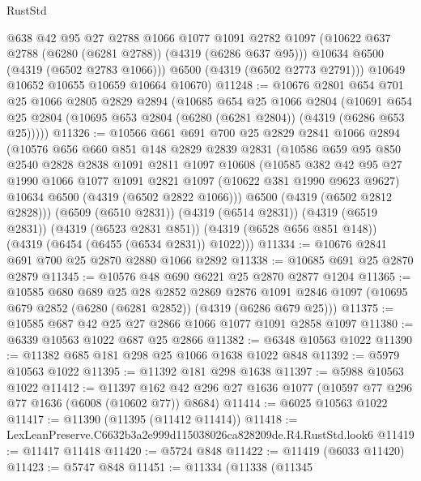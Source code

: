 \begin{lexlean}{RustStd}
\begin{coremodule}
          @638
          @42
          @95
          @27
          @2788
          @1066
          @1077
          @1091
          @2782
          @1097
          (@10622 @637 @2788 (@6280 (@6281 @2788)) (@4319 (@6286 @637 @95)))
          @10634
          @6500
          (@4319 (@6502 @2783 @1066)))
        @6500
        (@4319 (@6502 @2773 @2791)))
      @10649
      @10652
      @10655
      @10659
      @10664
      @10670)
@11248 := @10676
    @2801
    @654
    @701
    @25
    @1066
    @2805
    @2829
    @2894
    (@10685
      @654
      @25
      @1066
      @2804
      (@10691 @654 @25 @2804 (@10695 @653 @2804 (@6280 (@6281 @2804)) (@4319 (@6286 @653 @25)))))
@11326 := @10566
    @661
    @691
    @700
    @25
    @2829
    @2841
    @1066
    @2894
    (@10576
      @656
      @660
      @851
      @148
      @2829
      @2839
      @2831
      (@10586
        @659
        @95
        @850
        @2540
        @2828
        @2838
        @1091
        @2811
        @1097
        @10608
        (@10585
          @382
          @42
          @95
          @27
          @1990
          @1066
          @1077
          @1091
          @2821
          @1097
          (@10622 @381 @1990 @9623 @9627)
          @10634
          @6500
          (@4319 (@6502 @2822 @1066)))
        @6500
        (@4319 (@6502 @2812 @2828)))
      (@6509 (@6510 @2831))
      (@4319 (@6514 @2831))
      (@4319 (@6519 @2831))
      (@4319 (@6523 @2831 @851))
      (@4319 (@6528 @656 @851 @148))
      (@4319 (@6454 (@6455 (@6534 @2831)) @1022)))
@11334 := @10676 @2841 @691 @700 @25 @2870 @2880 @1066 @2892
@11338 := @10685 @691 @25 @2870 @2879
@11345 := @10576 @48 @690 @6221 @25 @2870 @2877 @1204
@11365 := @10585
    @680
    @689
    @25
    @28
    @2852
    @2869
    @2876
    @1091
    @2846
    @1097
    (@10695 @679 @2852 (@6280 (@6281 @2852)) (@4319 (@6286 @679 @25)))
@11375 := @10585 @687 @42 @25 @27 @2866 @1066 @1077 @1091 @2858 @1097
@11380 := @6339 @10563 @1022 @687 @25 @2866
@11382 := @6348 @10563 @1022
@11390 := @11382 @685 @181 @298 @25 @1066 @1638 @1022 @848
@11392 := @5979 @10563 @1022
@11395 := @11392 @181 @298 @1638
@11397 := @5988 @10563 @1022
@11412 := @11397
    @162
    @42
    @296
    @27
    @1636
    @1077
    (@10597 @77 @296 @77 @1636 (@6008 (@10602 @77)) @8684)
@11414 := @6025 @10563 @1022
@11417 := @11390 (@11395 (@11412 @11414))
@11418 := LexLeanPreserve.C6632b3a2e999d115038026ca828209de.R4.RustStd.look6
@11419 := @11417 @11418
@11420 := @5724 @848
@11422 := @11419 (@6033 @11420)
@11423 := @5747 @848
@11451 := @11334
    (@11338
      (@11345

\end{coremodule}
\end{lexlean}
